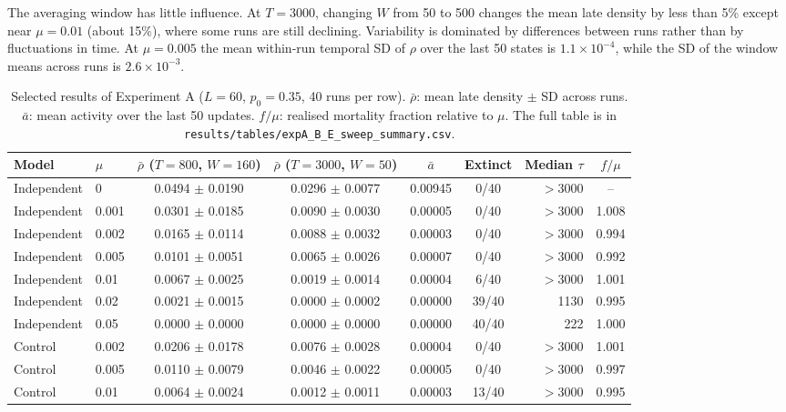 \documentclass[11pt,a4paper]{article}
\begin{document}
The averaging window has little influence. At $T=3000$, changing $W$ from 50 to 500 changes the mean late density by less than 5\% except near $\mu=0.01$ (about 15\%), where some runs are still declining. Variability is dominated by differences between runs rather than by fluctuations in time. At $\mu=0.005$ the mean within-run temporal SD of $\rho$ over the last 50 states is $1.1\times10^{-4}$, while the SD of the window means across runs is $2.6\times10^{-3}$.

\begin{table}[t]
\centering\footnotesize\setlength{\tabcolsep}{4pt}
\caption{Selected results of Experiment A ($L=60$, $p_0=0.35$, 40 runs per row). $\bar\rho$: mean late density $\pm$ SD across runs. $\bar a$: mean activity over the last 50 updates. $f/\mu$: realised mortality fraction relative to $\mu$. The full table is in \texttt{results/tables/expA\_B\_E\_sweep\_summary.csv}.}
\label{tab:sweep}
\begin{tabular}{llccccrc}
\toprule
Model & $\mu$ & $\bar\rho$ ($T{=}800$, $W{=}160$) & $\bar\rho$ ($T{=}3000$, $W{=}50$) & $\bar a$ & Extinct & Median $\tau$ & $f/\mu$\\
\midrule
Independent & 0 & 0.0494 $\pm$ 0.0190 & 0.0296 $\pm$ 0.0077 & 0.00945 & 0/40 & $>3000$ & -- \\
Independent & 0.001 & 0.0301 $\pm$ 0.0185 & 0.0090 $\pm$ 0.0030 & 0.00005 & 0/40 & $>3000$ & 1.008 \\
Independent & 0.002 & 0.0165 $\pm$ 0.0114 & 0.0088 $\pm$ 0.0032 & 0.00003 & 0/40 & $>3000$ & 0.994 \\
Independent & 0.005 & 0.0101 $\pm$ 0.0051 & 0.0065 $\pm$ 0.0026 & 0.00007 & 0/40 & $>3000$ & 0.992 \\
Independent & 0.01 & 0.0067 $\pm$ 0.0025 & 0.0019 $\pm$ 0.0014 & 0.00004 & 6/40 & $>3000$ & 1.001 \\
Independent & 0.02 & 0.0021 $\pm$ 0.0015 & 0.0000 $\pm$ 0.0002 & 0.00000 & 39/40 & 1130 & 0.995 \\
Independent & 0.05 & 0.0000 $\pm$ 0.0000 & 0.0000 $\pm$ 0.0000 & 0.00000 & 40/40 & 222 & 1.000 \\
\midrule
Control & 0.002 & 0.0206 $\pm$ 0.0178 & 0.0076 $\pm$ 0.0028 & 0.00004 & 0/40 & $>3000$ & 1.001 \\
Control & 0.005 & 0.0110 $\pm$ 0.0079 & 0.0046 $\pm$ 0.0022 & 0.00005 & 0/40 & $>3000$ & 0.997 \\
Control & 0.01 & 0.0064 $\pm$ 0.0024 & 0.0012 $\pm$ 0.0011 & 0.00003 & 13/40 & $>3000$ & 0.995 \\

\end{tabular}
\end{table}
\end{document}
